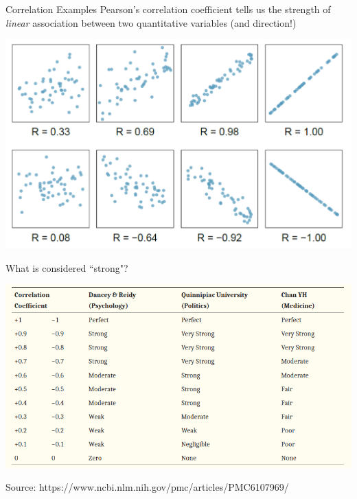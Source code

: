 \documentclass{beamer}
\begin{document}
\begin{frame}{Correlation Examples}
Pearson's correlation coefficient tells us the strength of \textit{linear} association between two quantitative variables (and direction!) 

\begin{center}
\includegraphics[scale=0.25]{cor_examples.png}
\end{center}
\end{frame}

\begin{frame}{What is considered ``strong"?}
\begin{center}
\includegraphics[scale=0.4]{correlation_table.png}
\end{center}
{\tiny Source: https://www.ncbi.nlm.nih.gov/pmc/articles/PMC6107969/}
\end{frame}
\end{document}
